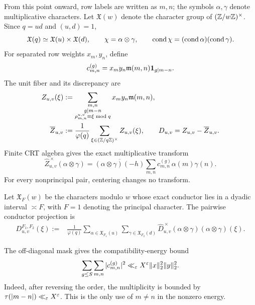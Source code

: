 From this point onward, row labels are written as $m,n$; the symbols
$\alpha,\gamma$ denote multiplicative characters.
Let $\mathfrak X(w)$ denote the character group of
\((\mathbb Z/w\mathbb Z)^\times\).  Since $q=ud$ and $(u,d)=1$,
\begin{equation}
 \mathfrak X(q)\simeq\mathfrak X(u)\times\mathfrak X(d),
 \qquad \chi=\alpha\otimes\gamma,
 \qquad \operatorname{cond}\chi=(\operatorname{cond}\alpha)(\operatorname{cond}\gamma).
 \label{eq:tpc28-product-characters}
\end{equation}
For separated row weights $x_m,y_n$, define
\begin{equation}
 c_{m,n}^{(g)}
 =x_my_n\mathfrak m(m,n)\mathbf 1_{g\mid m-n}.
 \label{eq:tpc28-compatibility-matrix}
\end{equation}
The unit fiber and its discrepancy are
\begin{align}
 Z_{u,v}(\xi)
 &:=\sum_{\substack{m,n\\g\mid m-n\\
 \rho_{m,n}^{u,v}\equiv\xi\bmod q}}
 x_my_n\mathfrak m(m,n),
 \label{eq:tpc28-unit-fiber}\\
 \overline Z_{u,v}
 &:=\frac1{\varphi(q)}\sum_{\xi\in(\mathbb Z/q\mathbb Z)^\times}Z_{u,v}(\xi),
 \qquad D_{u,v}=Z_{u,v}-\overline Z_{u,v}.
 \label{eq:tpc28-unit-discrepancy}
\end{align}
Finite CRT algebra gives the exact multiplicative transform
\begin{equation}
 \widehat Z_{u,v}^{\,\times}(\alpha\otimes\gamma)
 =\overline{(\alpha\otimes\gamma)(-h)}
 \sum_{m,n}c_{m,n}^{(g)}\alpha(m)\gamma(n).
 \label{eq:tpc28-exact-transform}
\end{equation}
For every nonprincipal pair, centering changes no transform.

Let $\mathfrak X_F(w)$ be the characters modulo $w$ whose exact
conductor lies in a dyadic interval $\asymp F$, with $F=1$
denoting the principal character.  The pairwise conductor projection is
\begin{align}
 D_{u,v}^{F_1,F_2}(\xi)
 :={}&\frac1{\varphi(q)}
 \sum_{\alpha\in\mathfrak X_{F_1}(u)}
 \sum_{\gamma\in\mathfrak X_{F_2}(d)}
 \widehat D_{u,v}^{\,\times}(\alpha\otimes\gamma)
 (\alpha\otimes\gamma)(\xi).
 \label{eq:tpc28-pair-projection}
\end{align}

The off-diagonal mask gives the compatibility-energy bound
\begin{equation}
 \sum_{g\le S}\sum_{m,n}|c_{m,n}^{(g)}|^2
 \ll_\varepsilon X^\varepsilon\|x\|_2^2\|y\|_2^2.
 \label{eq:tpc28-compatibility-energy}
\end{equation}
Indeed, after reversing the order, the multiplicity is bounded by
\(\tau(|m-n|)\ll_\varepsilon X^\varepsilon\).  This is the only use of
$m\ne n$ in the nonzero energy.

